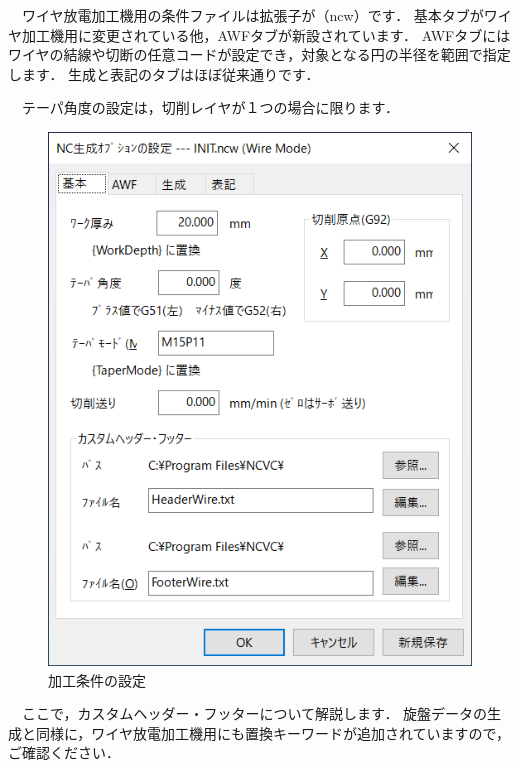 \begin{minipage}[t]{0.4\textwidth}
　ワイヤ放電加工機用の条件ファイルは拡張子が（ncw）です．
基本タブがワイヤ加工機用に変更されている他，AWFタブが新設されています．
AWFタブにはワイヤの結線や切断の任意コードが設定でき，対象となる円の半径を範囲で指定します．
生成と表記のタブはほぼ従来通りです．

　テーパ角度の設定は，切削レイヤが１つの場合に限ります．
\end{minipage}
\begin{minipage}[t]{0.6\textwidth}
\vspace*{-2zh}
\begin{figure}[H]
\centering
\includegraphics[scale=0.7]{No1/fig/ncw1.png}
\caption{加工条件の設定}
\label{fig:ncw1.png}
\end{figure}
\end{minipage}

\vspace*{1zh}
　ここで，カスタムヘッダー・フッターについて解説します．
旋盤データの生成と同様に，ワイヤ放電加工機用にも置換キーワードが追加されていますので，ご確認ください．

